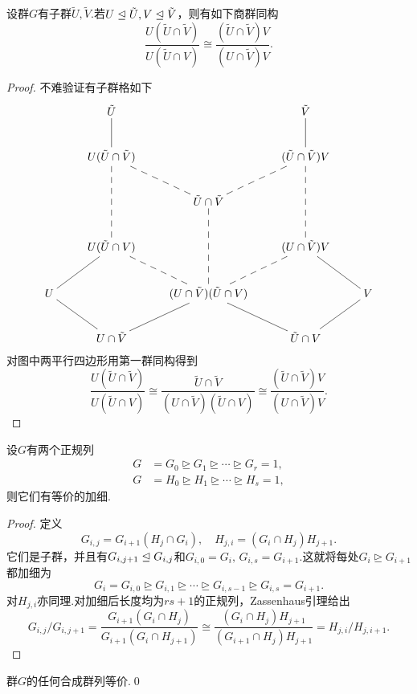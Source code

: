 \begin{lemma*}[(Zassenhaus)]
	设群$G$有子群$\tilde{U},\tilde{V}$.若$U\trianglelefteq\tilde{U},V\trianglelefteq\tilde{V}$，则有如下商群同构
	\[
		\frac{U(\tilde{U}\cap\tilde{V})}{U(\tilde{U}\cap V)}\cong\frac{(\tilde{U}\cap\tilde{V})V}{(U\cap\tilde{V})V}.
	\]
\end{lemma*}
\begin{proof}
	不难验证有子群格如下
	\[
		\xymatrix{
			&\tilde{U}\ar@{-}[d]&&\tilde{V}\ar@{-}[d]&\\
			&U(\tilde{U}\cap\tilde{V})\ar@{--}[dd]\ar@{--}[rd]&&(\tilde{U}\cap\tilde{V})V\ar@{--}[dd]\ar@{--}[ld]&\\
			&&\tilde{U}\cap\tilde{V}\ar@{--}[dd]&&\\
			&U(\tilde{U}\cap V)\ar@{-}[ld]\ar@{--}[rd]&&(U\cap\tilde{V})V\ar@{--}[ld]\ar@{-}[rd]&\\
			U\ar@{-}[rd]&&(U\cap\tilde{V})(\tilde{U}\cap V)\ar@{-}[ld]\ar@{-}[rd]&&V\ar@{-}[ld]\\
			&U\cap\tilde{V}&&\tilde{U}\cap V&
		}
	\]
	对图中两平行四边形用第一群同构得到
	\begin{equation*}
		\frac{U(\tilde{U}\cap\tilde{V})}{U(\tilde{U}\cap V)}\cong\frac{\tilde{U}\cap\tilde{V}}{(U\cap\tilde{V})(\tilde{U}\cap V)}\cong\frac{(\tilde{U}\cap\tilde{V})V}{(U\cap\tilde{V})V}.
	\end{equation*}
\end{proof}
\begin{thm}[(Schreier加细)]
	设$G$有两个正规列
	\begin{align*}
		G & =G_0\trianglerighteq G_1\trianglerighteq\cdots\trianglerighteq G_r=1, \\
		G & =H_0\trianglerighteq H_1\trianglerighteq\cdots\trianglerighteq H_s=1,
	\end{align*}
	则它们有等价的加细.
\end{thm}
\begin{proof}
	定义
	\[
		G_{i,j}=G_{i+1}(H_j\cap G_i),\quad H_{j,i}=(G_i\cap H_j)H_{j+1}.
	\]
	它们是子群，并且有$G_{i,j+1}\trianglelefteq G_{i,j}$和$G_{i,0}=G_i,\,G_{i,s}=G_{i+1}$.这就将每处$G_i\trianglerighteq G_{i+1}$都加细为
	\[
		G_i=G_{i,0}\trianglerighteq G_{i,1}\trianglerighteq \cdots\trianglerighteq G_{i,s-1}\trianglerighteq G_{i,s}=G_{i+1}.
	\]
	对$H_{j,i}$亦同理.对加细后长度均为$rs+1$的正规列，Zassenhaus引理给出
	\begin{equation*}
		G_{i,j}/G_{i,j+1}=\frac{G_{i+1}(G_i\cap H_j)}{G_{i+1}(G_i\cap H_{j+1})}\cong\frac{(G_i\cap H_j)H_{j+1}}{(G_{i+1}\cap H_j)H_{j+1}}=H_{j,i}/H_{j,i+1}.
	\end{equation*}
\end{proof}
\begin{thm}
	群$G$的任何合成群列等价.\qed
\end{thm}

